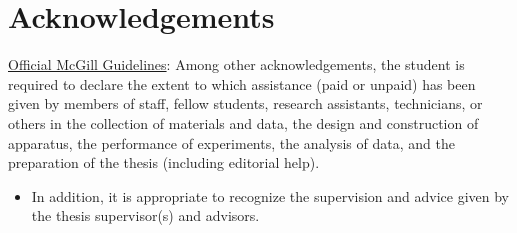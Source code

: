 \chapter*{\rm\bfseries Acknowledgements}
\label{ch:acknowledgement}

\href{https://www.mcgill.ca/gps/thesis/thesis-guidelines/preparation}{Official McGill Guidelines}: Among other acknowledgements, the student is required to declare the extent to which assistance (paid or unpaid) has been given by members of staff, fellow students, research assistants, technicians, or others in the collection of materials and data, the design and construction of apparatus, the performance of experiments, the analysis of data, and the preparation of the thesis (including editorial help).


\begin{itemize}
    \item{In addition, it is appropriate to recognize the supervision and advice given by the thesis supervisor(s) and advisors.}
\end{itemize}